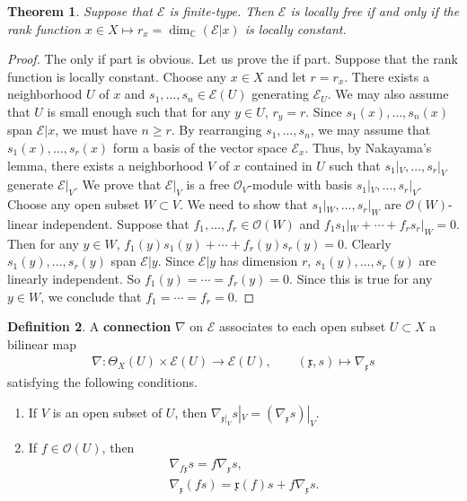 \documentclass[12pt,a4paper,notitlepage]{report}
\theoremstyle{definition}
\newtheorem{df}{Definition}[section]
\theoremstyle{plain}
\newtheorem{thm}[df]{Theorem}
\newcommand{\fk}{\mathfrak}
\newcommand{\scr}{\mathscr}
\newcommand{\mbb}{\mathbb}
\numberwithin{equation}{section}
\begin{document}
\begin{thm}\label{lb59}
Suppose that $\scr E$ is finite-type. Then $\scr E$ is locally free if and only if the rank function $x\in X\mapsto r_x=\dim_{\mbb C}(\scr E|x)$ is locally constant.
\end{thm}

\begin{proof}
The only if part is obvious. Let us prove the if part. Suppose that the rank function is locally constant. Choose any $x\in X$ and let $r=r_x$. There exists a neighborhood $U$ of $x$ and $s_1,\dots,s_n\in\scr E(U)$ generating $\scr E_U$. We may also assume that $U$ is small enough such that for any $y\in U$, $r_y=r$. Since $s_1(x),\dots,s_n(x)$ span $\scr E|x$, we must have $n\geq r$. By rearranging $s_1,\dots,s_n$, we may assume that $s_1(x),\dots,s_r(x)$ form a basis of the vector space $\scr E_x$. Thus, by Nakayama's lemma, there exists a neighborhood $V$ of $x$ contained in $U$ such that $s_1|_V,\dots,s_r|_V$ generate $\scr E|_V$. We prove that $\scr E|_V$ is a free $\scr O_V$-module with basis $s_1|_V,\dots,s_r|_V$. Choose any open subset $W\subset V$. We need to show that $s_1|_W,\dots,s_r|_W$ are $\scr O(W)$-linear independent. Suppose that $f_1,\dots,f_r\in\scr O(W)$ and $f_1s_1|_W+\cdots+f_rs_r|_W=0$. Then for any $y\in W$, $f_1(y)s_1(y)+\cdots+f_r(y)s_r(y)=0$. Clearly $s_1(y),\dots,s_r(y)$ span $\scr E|y$. Since $\scr E|y$ has dimension $r$, $s_1(y),\dots,s_r(y)$ are linearly independent. So $f_1(y)=\cdots=f_r(y)=0$. Since this is true for any $y\in W$, we conclude that $f_1=\cdots=f_r=0$. 
\end{proof}









\begin{df}\label{lb49}
A \textbf{connection} $\nabla$ on $\scr E$ associates to each open subset $U\subset X$ a bilinear map
\begin{gather*}
\nabla:\Theta_X(U)\times\scr E(U)\rightarrow\scr E(U),\qquad (\fk x,s)\mapsto \nabla_{\fk x} s
\end{gather*}
satisfying the following conditions.

\begin{enumerate}[label=(\alph*)]
\item If $V$ is an open subset of $U$, then $\nabla_{\fk x|_V}s|_V=(\nabla_{\fk x} s)|_V$.
\item If $f\in\scr O
(U)$, then
\begin{gather*}
\nabla_{f\fk x}s=f\nabla_{\fk x}s,\\
\nabla_{\fk x}(fs)=\fk x(f)s+f\nabla_{\fk x}s.
\end{gather*}
\end{enumerate}
\end{df}
\end{document}
